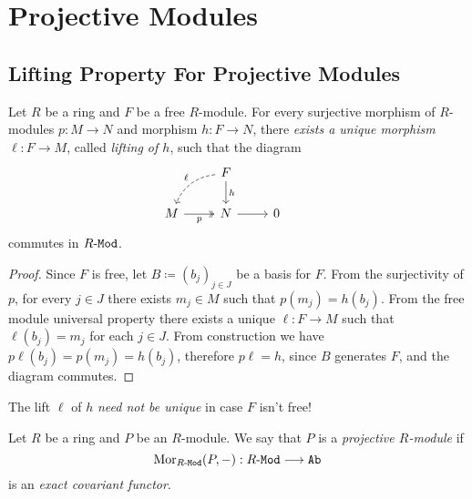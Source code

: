 \section{Projective Modules}

\subsection{Lifting Property For Projective Modules}

\begin{theorem}
    \label{thm:free-modules-are-projective}
    Let \(R\) be a ring and \(F\) be a free \(R\)-module. For every surjective
    morphism of \(R\)-modules \(p: M \to N\) and morphism \(h: F \to N\), there
    \emph{exists a unique morphism} \(\ell: F \to M\), called \emph{lifting of
        \(h\)}, such that the diagram
    \[
        \begin{tikzcd}
            &F \ar[d, "h"] \ar[dl, bend right, dashed, "\ell"'] & & \\
            M \ar[r, two heads, "p"'] &N \ar[r] &0
        \end{tikzcd}
    \]
    commutes in \({R\text{-}\texttt{Mod}}\).
\end{theorem}

\begin{proof}
    Since \(F\) is free, let \(B \coloneq (b_j)_{j \in J}\) be a basis for
    \(F\). From the surjectivity of \(p\), for every \(j \in J\) there exists
    \(m_j \in M\) such that \(p(m_j) = h(b_j)\). From the free module universal
    property there exists a unique \(\ell: F \to M\) such that \(\ell(b_j) = m_j\)
    for each \(j \in J\). From construction we have
    \(p \ell(b_j) = p(m_j) = h(b_j)\), therefore \(p \ell = h\), since \(B\)
    generates \(F\), and the diagram commutes.
\end{proof}

\begin{remark}
    \label{rem:uniqueness-of-lifting}
    The lift \(\ell\) of \(h\) \emph{need not be unique} in case \(F\) isn't free!
\end{remark}

\begin{definition}
    \label{def:projective-module}
    Let \(R\) be a ring and \(P\) be an \(R\)-module. We say that \(P\) is a
    \emph{projective \(R\)-module} if
    \[
        \operatorname{Mor}_{{R\text{-}\texttt{Mod}}}(P, -): {R\text{-}\texttt{Mod}} \longrightarrow {\texttt{Ab}}
    \]
    is an \emph{exact covariant functor}.
\end{definition}


